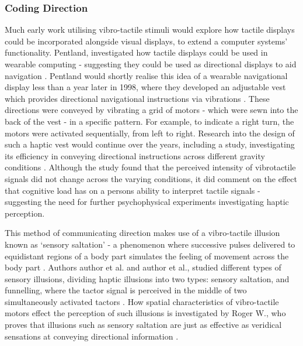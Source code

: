 \documentclass{interim}
\begin{document}
\subsubsection{Coding Direction}
Much early work utilising vibro-tactile stimuli would explore how tactile displays could be incorporated alongside visual displays, to extend a computer systems’ functionality. Pentland, investigated how tactile displays could be used in wearable computing - suggesting they could be used as directional displays to aid navigation \cite{629923}. Pentland would shortly realise this idea of a wearable navigational display less than a year later in 1998, where they developed an adjustable vest which provides directional navigational instructions via vibrations \cite{729547}. These directions were conveyed by vibrating a grid of motors - which were sewn into the back of the vest - in a specific pattern. For example, to indicate a right turn, the motors were activated sequentially, from left to right. Research into the design of such a haptic vest would continue over the years, including a study, investigating its efficiency in conveying directional instructions across different gravity conditions \cite{998954}. Although the study found that the perceived intensity of vibrotactile signals did not change across the varying conditions, it did comment on the effect that cognitive load has on a persons ability to interpret tactile signals - suggesting the need for further psychophysical experiments investigating haptic perception.

This method of communicating direction makes use of a vibro-tactile illusion known as ‘sensory saltation' - a phenomenon where successive pulses delivered to equidistant regions of a body part simulates the feeling of movement across the body part \cite{geldard1975sensory}. Authors author et al. and author et al., studied different types of sensory illusions, dividing haptic illusions into two types: sensory saltation, and funnelling, where the tactor signal is perceived in the middle of two simultaneously activated tactors \cite{5710913, s150407913}. How spatial characteristics of vibro-tactile motors effect the perception of such illusions is investigated by Roger W., who proves that illusions such as sensory saltation are just as effective as veridical sensations at conveying directional information \cite{cholewiak2000generation}.
\end{document}
